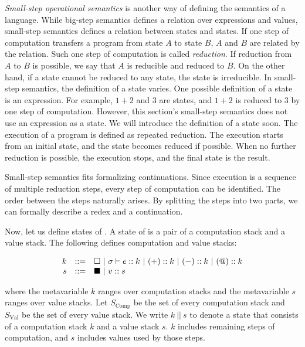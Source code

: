 \textit{Small-step operational semantics}
is another way of defining the semantics of a language. While big-step semantics
defines a relation over expressions and values, small-step semantics
defines a relation between states and states.
If one step of computation transfers a program from state $A$ to state $B$,
$A$ and $B$ are related by the relation. Such one step of computation is called
\textit{reduction}. If reduction from $A$ to $B$ is possible,
we say that $A$ is reducible and reduced to $B$. On the other
hand, if a state cannot be reduced to any state, the state is irreducible.
In small-step semantics, the definition
of a state varies. One possible definition of a state is an expression.
For example, $1+2$ and $3$ are states, and $1+2$ is reduced to $3$ by one step
of computation. However, this section's small-step semantics does not use an
expression as a state. We will introduce the definition of a state soon.
The execution of a program is defined as repeated reduction. The execution
starts from an initial state, and the state becomes reduced if possible. When
no further reduction is possible, the execution stops, and the final state is
the result.

Small-step semantics fits formalizing continuations. Since execution is a
sequence of multiple reduction steps, every step of computation can be
identified. The order between the steps naturally arises. By splitting the steps
into two parts, we can formally describe a redex and a continuation.

Now, let us define states of \lang.
A state of \lang is a pair of a computation stack and a value stack.
The following defines computation and value stacks:

\[
\begin{array}{rrl}
k & ::= & \square
  \ |\  \sigma\vdash e:: k
  \ |\  (+):: k
  \ |\  (-):: k
  \ |\  (@):: k \\
s & ::= & \blacksquare
  \ |\ v:: s
\end{array}
\]

where the metavariable $k$ ranges over computation stacks and the metavariable $s$
ranges over value stacks. Let $S_{\text{Comp}}$ be the set of every
computation stack and $S_{\text{Val}}$ be the set of every value stack.
We write $k\ ||\ s$ to denote a state that consists of
a computation stack $k$ and a value stack $s$. $k$ includes remaining steps
of computation, and $s$ includes values used by those steps.

